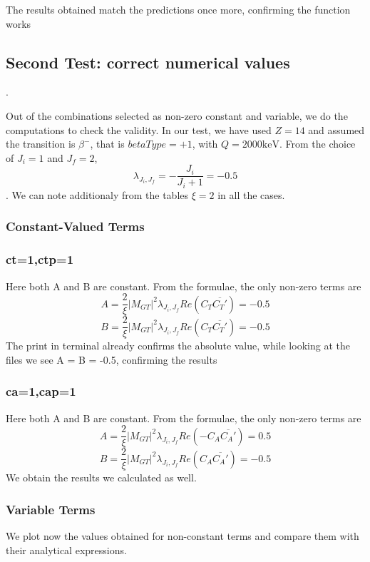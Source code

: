 \documentclass[twocolumn]{article}
\begin{document}
The results obtained match the predictions once more, confirming the function works

\subsection{Second Test: correct numerical values}.

Out of the combinations selected as non-zero constant and variable, we do the computations to check the validity. In our test, we have used $Z=14$ and assumed the transition is $\beta^-$, that is $betaType=+1$, with $Q = 2000\mathrm{keV}$. From the choice of $J_i = 1$ and $J_f = 2$, $$\lambda_{J_i,J_f}=-\frac{J_i}{J_i+1} = -0.5$$. We can note additionaly from the tables $\xi = 2$ in all the cases.

\subsubsection{Constant-Valued Terms}

\subsubsection*{ct=1,ctp=1}

Here both A and B are constant. From the formulae, the only non-zero terms are 
$$A = \frac{2}{\xi}|M_{GT}|^2\lambda_{J_i,J_f}Re(C_T\overline{C_T'}) = -0.5$$
$$B = \frac{2}{\xi}|M_{GT}|^2\lambda_{J_i,J_f}Re(C_T\overline{C_T'}) = -0.5$$
The print in terminal already confirms the absolute value, while looking at the files we see A = B = -0.5, confirming the results

\subsubsection*{ca=1,cap=1}

Here both A and B are constant. From the formulae, the only non-zero terms are 
$$A = \frac{2}{\xi}|M_{GT}|^2\lambda_{J_i,J_f}Re(-C_A\overline{C_A'}) = 0.5$$
$$B = \frac{2}{\xi}|M_{GT}|^2\lambda_{J_i,J_f}Re(C_A\overline{C_A'}) =-0.5$$
We obtain the results we calculated as well.

\subsubsection{Variable Terms}

We plot now the values obtained for non-constant terms and compare them with their analytical expressions.
\end{document}
